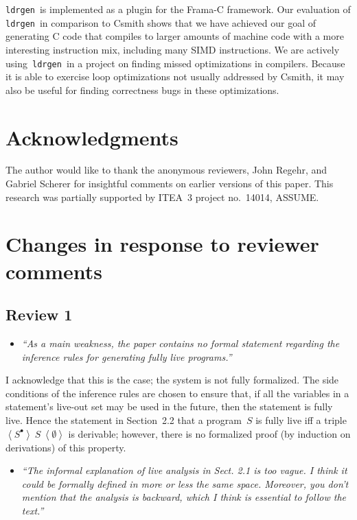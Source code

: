 \documentclass{llncs}
\newcommand\ldrgen{\texttt{ldrgen}}
\newcommand{\livein}[1]{\ensuremath{#1^{\bullet}}}
\newcommand{\triple}[3]{\ensuremath{
    \left\langle#1\right\rangle \ #2 \ \left\langle#3\right\rangle
}}
\begin{document}
\ldrgen\ is implemented as a plugin for the Frama-C framework. Our
evaluation of \ldrgen\ in comparison to Csmith shows that we have achieved
our goal of generating C code that compiles to larger amounts of machine
code with a more interesting instruction mix, including many SIMD
instructions. We are actively using~\ldrgen\ in a project on finding missed
optimizations in compilers. Because it is able to exercise loop
optimizations not usually addressed by Csmith, it may also be useful for
finding correctness bugs in these optimizations.

\section*{Acknowledgments}

The author would like to thank the anonymous reviewers, John Regehr, and
Gabriel Scherer for insightful comments on earlier versions of this paper.
This research was partially supported by ITEA~3 project no.~14014, ASSUME.





\newpage
\appendix

\section{Changes in response to reviewer comments}

\subsection{Review 1}

\begin{itemize}\item
\emph{``As a main weakness, the paper contains no formal statement regarding
the inference rules for generating fully live programs.''}
\end{itemize}

I acknowledge that this is the case; the system is not fully formalized. The
side conditions of the inference rules are chosen to ensure that, if all the
variables in a statement's live-out set may be used in the future, then the
statement is fully live. Hence the statement in Section~2.2 that a
program~\(S\) is fully live iff a
triple~\(\triple{\livein{S}}{S}{\emptyset}\) is derivable; however, there
is no formalized proof (by induction on derivations) of this property.

\begin{itemize}\item
\emph{``The informal explanation of live analysis in Sect. 2.1 is too vague.
I think it could be formally defined in more or less the same space.
Moreover, you don't mention that the analysis is backward, which I think
is essential to follow the text.''}
\end{itemize}
\end{document}
